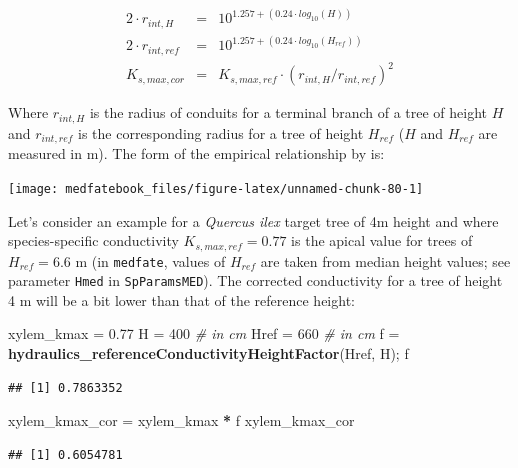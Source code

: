 \documentclass[]{book}
\newenvironment{Shaded}{\begin{snugshade}}{\end{snugshade}}
\newcommand{\KeywordTok}[1]{\textcolor[rgb]{0.13,0.29,0.53}{\textbf{#1}}}
\newcommand{\DecValTok}[1]{\textcolor[rgb]{0.00,0.00,0.81}{#1}}
\newcommand{\FloatTok}[1]{\textcolor[rgb]{0.00,0.00,0.81}{#1}}
\newcommand{\StringTok}[1]{\textcolor[rgb]{0.31,0.60,0.02}{#1}}
\newcommand{\CommentTok}[1]{\textcolor[rgb]{0.56,0.35,0.01}{\textit{#1}}}
\newcommand{\OperatorTok}[1]{\textcolor[rgb]{0.81,0.36,0.00}{\textbf{#1}}}
\newcommand{\NormalTok}[1]{#1}
\begin{document}
\begin{eqnarray}
2 \cdot r_{int,H}&=& 10^{1.257+(0.24\cdot log_{10}(H))} \\
2 \cdot r_{int,ref}&=&10^{1.257+(0.24\cdot log_{10}(H_{ref}))}\\
K_{s,max,cor}&=&K_{s,max,ref}\cdot (r_{int,H}/r_{int,ref})^{2}
\end{eqnarray}

Where \(r_{int,H}\) is the radius of conduits for a terminal branch of a
tree of height \(H\) and \(r_{int,ref}\) is the corresponding radius for
a tree of height \(H_{ref}\) (\(H\) and \(H_{ref}\) are measured in m).
The form of the empirical relationship by \citet{Olson2014} is:

\begin{center}\texttt{[image: medfatebook\_files/figure-latex/unnamed-chunk-80-1]} \end{center}

Let's consider an example for a \emph{Quercus ilex} target tree of 4m
height and where species-specific conductivity \(K_{s,max,ref} = 0.77\)
is the apical value for trees of \(H_{ref} = 6.6\) m (in
\texttt{medfate}, values of \(H_{ref}\) are taken from median height
values; see parameter \texttt{Hmed} in \texttt{SpParamsMED}). The
corrected conductivity for a tree of height 4 m will be a bit lower than
that of the reference height:

\begin{Shaded}
\begin{Highlighting}[]
\NormalTok{xylem_kmax =}\StringTok{ }\FloatTok{0.77}
\NormalTok{H =}\StringTok{ }\DecValTok{400} \CommentTok{# in cm}
\NormalTok{Href =}\StringTok{ }\DecValTok{660} \CommentTok{# in cm}
\NormalTok{f =}\StringTok{ }\KeywordTok{hydraulics_referenceConductivityHeightFactor}\NormalTok{(Href, H);}
\NormalTok{f}
\end{Highlighting}
\end{Shaded}

\begin{verbatim}
## [1] 0.7863352
\end{verbatim}

\begin{Shaded}
\begin{Highlighting}[]
\NormalTok{xylem_kmax_cor =}\StringTok{ }\NormalTok{xylem_kmax }\OperatorTok{*}\StringTok{ }\NormalTok{f}
\NormalTok{xylem_kmax_cor}
\end{Highlighting}
\end{Shaded}

\begin{verbatim}
## [1] 0.6054781
\end{verbatim}
\end{document}
